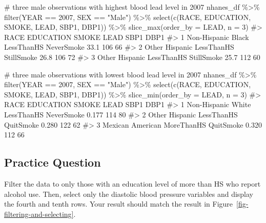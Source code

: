 \documentclass[
  letterpaper,
]{latex/krantz}
\makeatletter
\newenvironment{Shaded}{\begin{snugshade}}{\end{snugshade}}
\newcommand{\AttributeTok}[1]{\textcolor[rgb]{0.40,0.45,0.13}{#1}}
\newcommand{\CommentTok}[1]{\textcolor[rgb]{0.37,0.37,0.37}{#1}}
\newcommand{\DecValTok}[1]{\textcolor[rgb]{0.68,0.00,0.00}{#1}}
\newcommand{\FunctionTok}[1]{\textcolor[rgb]{0.28,0.35,0.67}{#1}}
\newcommand{\NormalTok}[1]{\textcolor[rgb]{0.00,0.23,0.31}{#1}}
\newcommand{\SpecialCharTok}[1]{\textcolor[rgb]{0.37,0.37,0.37}{#1}}
\newcommand{\StringTok}[1]{\textcolor[rgb]{0.13,0.47,0.30}{#1}}
\newenvironment{kframe}{%
\medskip{}
\setlength{\fboxsep}{.8em}
 \def\at@end@of@kframe{}%
 \ifinner\ifhmode%
  \def\at@end@of@kframe{\end{minipage}}%
  \begin{minipage}{\columnwidth}%
 \fi\fi%
 \def\FrameCommand##1{\hskip\@totalleftmargin \hskip-\fboxsep
 \colorbox{shadecolor}{##1}\hskip-\fboxsep
     \hskip-\linewidth \hskip-\@totalleftmargin \hskip\columnwidth}%
 \MakeFramed {\advance\hsize-\width
   \@totalleftmargin\z@ \linewidth\hsize
   \@setminipage}}%
 {\par\unskip\endMakeFramed%
 \at@end@of@kframe}
\renewenvironment{Shaded}{\begin{kframe}}{\end{kframe}}
\makeatother
\begin{document}
\begin{Shaded}
\begin{Highlighting}[]
\CommentTok{\# three male observations with highest blood lead level in 2007}
\NormalTok{nhanes\_df }\SpecialCharTok{\%\textgreater{}\%}
  \FunctionTok{filter}\NormalTok{(YEAR }\SpecialCharTok{==} \DecValTok{2007}\NormalTok{, SEX }\SpecialCharTok{==} \StringTok{"Male"}\NormalTok{) }\SpecialCharTok{\%\textgreater{}\%}
  \FunctionTok{select}\NormalTok{(}\FunctionTok{c}\NormalTok{(RACE, EDUCATION, SMOKE, LEAD, SBP1, DBP1)) }\SpecialCharTok{\%\textgreater{}\%}
  \FunctionTok{slice\_max}\NormalTok{(}\AttributeTok{order\_by =}\NormalTok{ LEAD, }\AttributeTok{n =} \DecValTok{3}\NormalTok{)}
\CommentTok{\#\textgreater{}                 RACE  EDUCATION      SMOKE LEAD SBP1 DBP1}
\CommentTok{\#\textgreater{} 1 Non{-}Hispanic Black LessThanHS NeverSmoke 33.1  106   66}
\CommentTok{\#\textgreater{} 2     Other Hispanic LessThanHS StillSmoke 26.8  106   72}
\CommentTok{\#\textgreater{} 3     Other Hispanic LessThanHS StillSmoke 25.7  112   60}

\CommentTok{\# three male observations with lowest blood lead level in 2007}
\NormalTok{nhanes\_df }\SpecialCharTok{\%\textgreater{}\%}
  \FunctionTok{filter}\NormalTok{(YEAR }\SpecialCharTok{==} \DecValTok{2007}\NormalTok{, SEX }\SpecialCharTok{==} \StringTok{"Male"}\NormalTok{) }\SpecialCharTok{\%\textgreater{}\%}
  \FunctionTok{select}\NormalTok{(}\FunctionTok{c}\NormalTok{(RACE, EDUCATION, SMOKE, LEAD, SBP1, DBP1)) }\SpecialCharTok{\%\textgreater{}\%}
  \FunctionTok{slice\_min}\NormalTok{(}\AttributeTok{order\_by =}\NormalTok{ LEAD, }\AttributeTok{n =} \DecValTok{3}\NormalTok{)}
\CommentTok{\#\textgreater{}                 RACE  EDUCATION      SMOKE  LEAD SBP1 DBP1}
\CommentTok{\#\textgreater{} 1 Non{-}Hispanic White LessThanHS NeverSmoke 0.177  114   80}
\CommentTok{\#\textgreater{} 2     Other Hispanic LessThanHS  QuitSmoke 0.280  122   62}
\CommentTok{\#\textgreater{} 3   Mexican American MoreThanHS  QuitSmoke 0.320  112   66}
\end{Highlighting}
\end{Shaded}

\subsection{Practice Question}\label{practice-question-8}

Filter the data to only those with an education level of more than HS
who report alcohol use. Then, select only the diastolic blood pressure
variables and display the fourth and tenth rows. Your result should
match the result in Figure~\ref{fig-filtering-and-selecting}.
\end{document}

